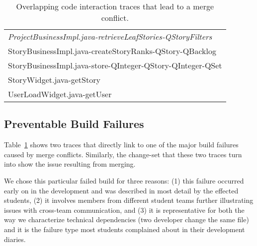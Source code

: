 \begin{table}[t!]
\begin{tabular}{l}
     \emph{ProjectBusinessImpl.java-retrieveLeafStories-QStoryFilters}                                 \\%
     StoryBusinessImpl.java-createStoryRanks-QStory-QBacklog                     \\%
     StoryBusinessImpl.java-store-QInteger-QStory-QInteger-QSet  \\%
     StoryWidget.java-getStory                                                       \\%
     UserLoadWidget.java-getUser                                                     \\%
      \bottomrule
\end{tabular}
\caption{Overlapping code interaction traces that lead to a merge conflict.}
\label{tab:overlappingtraces}
\end{table}

\subsection{Preventable Build Failures}
Table~\ref{tab:overlappingtraces} shows two traces that directly link to one of the major build failures caused by merge conflicts.
Similarly, the change-set that these two traces turn into show the issue resulting from merging.

We chose this particular failed build for three reasons:
(1) this failure occurred early on in the development and was described in most detail by the effected students,
(2) it involves members from different student teams further illustrating issues with cross-team communication,
and (3) it is representative for both the way we characterize technical dependencies (two developer change the same file) and it is the failure type most students complained about in their development diaries.

